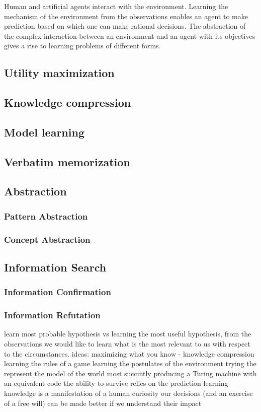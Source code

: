 Human and artificial agents interact with the environment. Learning the mechanism of the environment from the observations enables an agent to make prediction based on which one can make rational decisions. The abstraction of the complex interaction between an environment and an agent with its objectives gives a rise to learning problems of different forms.

\subsection{Utility maximization}
\subsection{Knowledge compression}
\subsection{Model learning}
\subsection{Verbatim memorization}
\subsection{Abstraction}
\subsubsection{Pattern Abstraction}
\subsubsection{Concept Abstraction}
\subsection{Information Search}
\subsubsection{Information Confirmation}
\subsubsection{Information Refutation}

learn most probable hypothesis vs learning the most useful hypothesis, from the observations we would like to learn what is the most relevant to us with respect to the circumstances.
ideas:
maximizing what you know - knowledge compression
learning the rules of a game
learning the postulates of the environment
trying the represent the model of the world most succintly
producing a Turing machine with an equivalent code
the ability to survive relies on the prediction
learning knowledge is a manifestation of a human curiosity
our decisions (and an exercise of a free will) can be made better if we understand their impact
